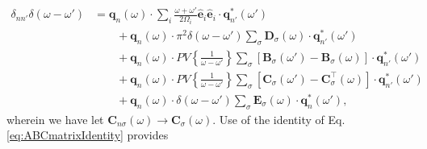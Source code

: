\begin{equation}
\begin{split}
\delta_{nn'}\delta(\omega - \omega') &= \mathbf{q}_n(\omega)\cdot\sum_{i}\frac{\omega + \omega'}{2\Omega_i}\hat{\mathbf{e}}_i\hat{\mathbf{e}}_i\cdot\mathbf{q}_{n'}^*(\omega')\\
&\qquad + \mathbf{q}_n(\omega)\cdot\pi^2\delta(\omega - \omega')\sum_\sigma\mathbf{D}_\sigma(\omega)\cdot\mathbf{q}_{n'}^*(\omega')\\
&\qquad + \mathbf{q}_n(\omega)\cdot PV\left\{\frac{1}{\omega - \omega'}\right\}\sum_\sigma\left[\mathbf{B}_\sigma(\omega') - \mathbf{B}_\sigma(\omega)\right]\cdot\mathbf{q}_{n'}^*(\omega')\\
&\qquad + \mathbf{q}_{n}(\omega)\cdot PV\left\{\frac{1}{\omega - \omega'}\right\}\sum_\sigma\left[\mathbf{C}_\sigma(\omega') - \mathbf{C}_\sigma^\top(\omega)\right]\cdot\mathbf{q}_{n'}^*(\omega')\\
&\qquad + \mathbf{q}_n(\omega)\cdot\delta(\omega - \omega')\sum_\sigma\mathbf{E}_\sigma(\omega)\cdot\mathbf{q}_n^*(\omega'),
\end{split}
\end{equation}
wherein we have let $\mathbf{C}_{n\sigma}(\omega)\to\mathbf{C}_\sigma(\omega)$. Use of the identity of Eq. \eqref{eq:ABCmatrixIdentity} provides
